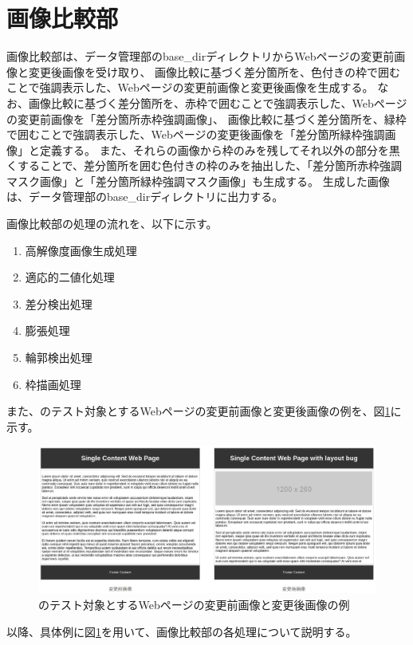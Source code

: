 \section{画像比較部}\label{sec:Difference_extraction_section}
画像比較部は、データ管理部のbase\_dirディレクトリからWebページの変更前画像と変更後画像を受け取り、
画像比較に基づく差分箇所を、色付きの枠で囲むことで強調表示した、Webページの変更前画像と変更後画像を生成する。
なお、画像比較に基づく差分箇所を、赤枠で囲むことで強調表示した、Webページの変更前画像を「差分箇所赤枠強調画像」、
画像比較に基づく差分箇所を、緑枠で囲むことで強調表示した、Webページの変更後画像を「差分箇所緑枠強調画像」と定義する。
また、それらの画像から枠のみを残してそれ以外の部分を黒くすることで、差分箇所を囲む色付きの枠のみを抽出した、「差分箇所赤枠強調マスク画像」と「差分箇所緑枠強調マスク画像」も生成する。
生成した画像は、データ管理部のbase\_dirディレクトリに出力する。
\par
画像比較部の処理の流れを、以下に示す。
\begin{enumerate}
    \item 高解像度画像生成処理
    \item 適応的二値化処理
    \item 差分検出処理
    \item 膨張処理
    \item 輪郭検出処理
    \item 枠描画処理
\end{enumerate}
また、\toolName のテスト対象とするWebページの変更前画像と変更後画像の例を、図\ref{fig: img_original_bf_af}に示す。
\begin{figure}[tp]
    \begin{center}
        \includegraphics[width=1.0\columnwidth]{image/4_img_original_bf_af.png}
        \caption{\toolName のテスト対象とするWebページの変更前画像と変更後画像の例}
        \label{fig: img_original_bf_af}
    \end{center}
\end{figure}
以降、具体例に図\ref{fig: img_original_bf_af}を用いて、画像比較部の各処理について説明する。

